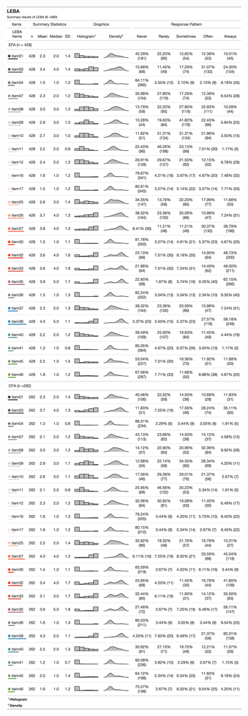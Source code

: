 \documentclass[
  english,
  man]{apa6}
\begin{document}
\begin{figure}
\includegraphics[width=2\linewidth,height=1\textheight]{Manuscript.figures/gt} \caption{ }\label{fig:gtPic}
\end{figure}
\end{document}
